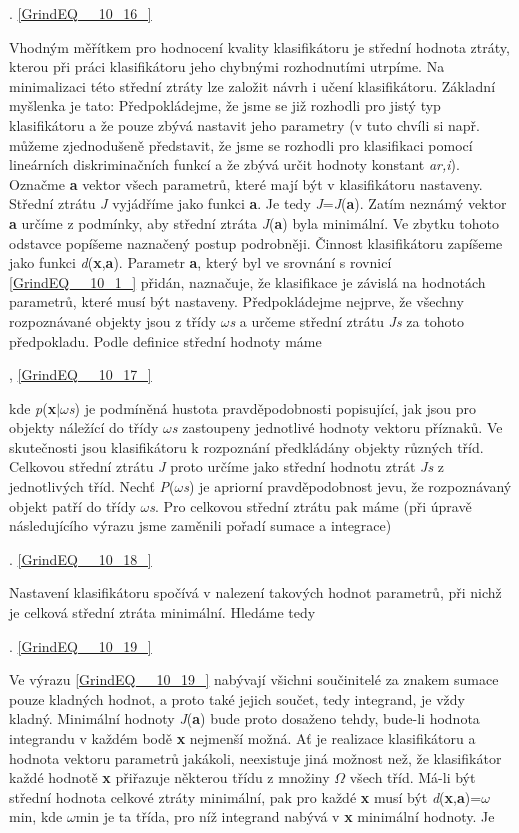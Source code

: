  . \eqref{GrindEQ__10_16_}

\noindent Vhodným měřítkem pro hodnocení kvality klasifikátoru je střední hodnota ztráty, kterou při práci klasifikátoru jeho chybnými rozhodnutími utrpíme. Na minimalizaci této střední ztráty lze založit návrh i učení klasifikátoru. Základní myšlenka je tato: Předpokládejme, že jsme se již rozhodli pro jistý typ klasifikátoru a že pouze zbývá nastavit jeho parametry (v tuto chvíli si např. můžeme zjednodušeně představit, že jsme se rozhodli pro klasifikaci pomocí lineárních diskriminačních funkcí a že zbývá určit hodnoty konstant \textit{ar,i}). Označme \textbf{a} vektor všech parametrů, které mají být v klasifikátoru nastaveny. Střední ztrátu \textit{J} vyjádříme jako funkci \textbf{a}. Je tedy \textit{J}=\textit{J}(\textbf{a}). Zatím neznámý vektor \textbf{a} určíme z podmínky, aby střední ztráta \textit{J}(\textbf{a}) byla minimální. Ve zbytku tohoto odstavce popíšeme naznačený postup podrobněji. Činnost klasifikátoru zapíšeme jako funkci \textit{d}(\textbf{x},\textbf{a}). Parametr \textbf{a}, který byl ve srovnání s rovnicí \eqref{GrindEQ__10_1_} přidán, naznačuje, že klasifikace je závislá na hodnotách parametrů, které musí být nastaveny. Předpokládejme nejprve, že všechny rozpoznávané objekty jsou z třídy $\omega$\textit{s} a určeme střední ztrátu \textit{Js} za tohoto předpokladu. Podle definice střední hodnoty máme   

 , \eqref{GrindEQ__10_17_}

\noindent kde \textit{p}(\textbf{x}$\mid$$\omega$\textit{s}) je podmíněná hustota pravděpodobnosti popisující, jak jsou pro objekty náležící do třídy $\omega$\textit{s} zastoupeny jednotlivé hodnoty vektoru příznaků. Ve skutečnosti jsou klasifikátoru k rozpoznání předkládány objekty různých tříd. Celkovou střední ztrátu \textit{J} proto určíme jako střední hodnotu ztrát \textit{Js} z jednotlivých tříd. Nechť \textit{P}($\omega$\textit{s}) je apriorní pravděpodobnost jevu, že rozpoznávaný objekt patří do třídy $\omega$\textit{s}. Pro celkovou střední ztrátu pak máme (při úpravě následujícího výrazu jsme zaměnili pořadí sumace a integrace)

 . \eqref{GrindEQ__10_18_}

\noindent Nastavení klasifikátoru spočívá v nalezení takových hodnot parametrů, při nichž je celková střední ztráta minimální. Hledáme tedy

 . \eqref{GrindEQ__10_19_}

\noindent Ve výrazu \eqref{GrindEQ__10_19_} nabývají všichni součinitelé za znakem sumace pouze kladných hodnot, a proto také jejich součet, tedy integrand, je vždy kladný. Minimální hodnoty \textit{J}(\textbf{a}) bude proto dosaženo tehdy, bude-li hodnota integrandu v každém bodě \textbf{x} nejmenší možná. Ať je realizace klasifikátoru a hodnota vektoru parametrů jakákoli, neexistuje jiná možnost než, že klasifikátor každé hodnotě \textbf{x} přiřazuje některou třídu z množiny $\Omega$ všech tříd. Má-li být střední hodnota celkové ztráty minimální, pak pro každé \textbf{x} musí být \textit{d}(\textbf{x},\textbf{a})=$\omega$min, kde $\omega$min je ta třída, pro níž integrand nabývá v \textbf{x} minimální hodnoty. Je 

